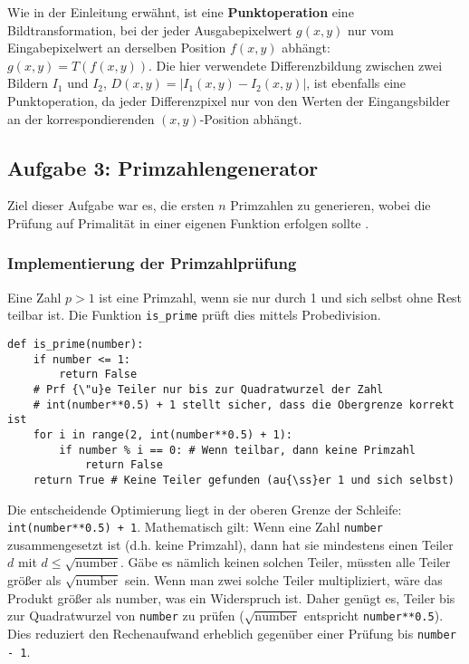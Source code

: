 \documentclass[11pt, a4paper]{article}
\begin{document}
Wie in der Einleitung erwähnt, ist eine \textbf{Punktoperation} eine Bildtransformation, bei der jeder Ausgabepixelwert $g(x, y)$ nur vom Eingabepixelwert an derselben Position $f(x, y)$ abhängt: $g(x, y) = T(f(x, y))$. Die hier verwendete Differenzbildung zwischen zwei Bildern $I_1$ und $I_2$, $D(x, y) = |I_1(x, y) - I_2(x, y)|$, ist ebenfalls eine Punktoperation, da jeder Differenzpixel nur von den Werten der Eingangsbilder an der korrespondierenden $(x, y)$-Position abhängt.

\subsection{Aufgabe 3: Primzahlengenerator}
Ziel dieser Aufgabe war es, die ersten $n$ Primzahlen zu generieren, wobei die Prüfung auf Primalität in einer eigenen Funktion erfolgen sollte \cite{uebungsblatt}.

\subsubsection{Implementierung der Primzahlprüfung}
Eine Zahl $p > 1$ ist eine Primzahl, wenn sie nur durch 1 und sich selbst ohne Rest teilbar ist. Die Funktion \texttt{is\_prime} prüft dies mittels Probedivision.
\begin{lstlisting}[caption={Python-Funktion zur Prüfung auf Primalität}, label=lst:is_prime]
def is_prime(number):
    if number <= 1:
        return False
    # Prf {\"u}e Teiler nur bis zur Quadratwurzel der Zahl
    # int(number**0.5) + 1 stellt sicher, dass die Obergrenze korrekt ist
    for i in range(2, int(number**0.5) + 1):
        if number % i == 0: # Wenn teilbar, dann keine Primzahl
            return False
    return True # Keine Teiler gefunden (au{\ss}er 1 und sich selbst)
\end{lstlisting}
Die entscheidende Optimierung liegt in der oberen Grenze der Schleife: \texttt{int(number**0.5) + 1}. Mathematisch gilt: Wenn eine Zahl \texttt{number} zusammengesetzt ist (d.h. keine Primzahl), dann hat sie mindestens einen Teiler $d$ mit $d \leq \sqrt{\text{number}}$. Gäbe es nämlich keinen solchen Teiler, müssten alle Teiler größer als $\sqrt{\text{number}}$ sein. Wenn man zwei solche Teiler multipliziert, wäre das Produkt größer als $\text{number}$, was ein Widerspruch ist. Daher genügt es, Teiler bis zur Quadratwurzel von \texttt{number} zu prüfen ($\sqrt{\text{number}}$ entspricht \texttt{number**0.5}). Dies reduziert den Rechenaufwand erheblich gegenüber einer Prüfung bis \texttt{number - 1}.
\end{document}
